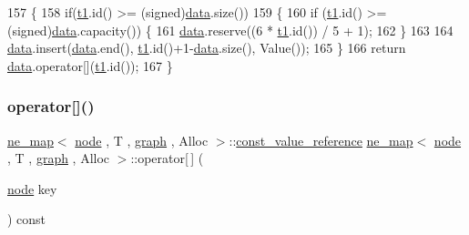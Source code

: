 \begin{DoxyCode}
157 \{
158     \textcolor{keywordflow}{if}(\mbox{\hyperlink{gml2nestedsql_8cpp_a214bd1a0500f5739ce581a8bcffb518a}{t1}}.id() >= (signed)\mbox{\hyperlink{classne__map_af73307678e05a9c24c084d98b267afa8}{data}}.size())
159     \{
160     \textcolor{keywordflow}{if} (\mbox{\hyperlink{gml2nestedsql_8cpp_a214bd1a0500f5739ce581a8bcffb518a}{t1}}.id() >= (signed)\mbox{\hyperlink{classne__map_af73307678e05a9c24c084d98b267afa8}{data}}.capacity()) \{
161         \mbox{\hyperlink{classne__map_af73307678e05a9c24c084d98b267afa8}{data}}.reserve((6 * \mbox{\hyperlink{gml2nestedsql_8cpp_a214bd1a0500f5739ce581a8bcffb518a}{t1}}.id()) / 5 + 1);
162     \}
163 
164     \mbox{\hyperlink{classne__map_af73307678e05a9c24c084d98b267afa8}{data}}.insert(\mbox{\hyperlink{classne__map_af73307678e05a9c24c084d98b267afa8}{data}}.end(), \mbox{\hyperlink{gml2nestedsql_8cpp_a214bd1a0500f5739ce581a8bcffb518a}{t1}}.id()+1-\mbox{\hyperlink{classne__map_af73307678e05a9c24c084d98b267afa8}{data}}.size(), Value());
165     \}
166     \textcolor{keywordflow}{return} \mbox{\hyperlink{classne__map_af73307678e05a9c24c084d98b267afa8}{data}}.operator[](\mbox{\hyperlink{gml2nestedsql_8cpp_a214bd1a0500f5739ce581a8bcffb518a}{t1}}.id());
167 \}
\end{DoxyCode}
\mbox{\label{classne__map_ad8d23cc924963ddff8267e625dcbffc6}} 
\subsubsection{\texorpdfstring{operator[]()}{operator[]()}\hspace{0.1cm}{\footnotesize\ttfamily [2/2]}}
{\footnotesize\ttfamily \mbox{\hyperlink{classne__map}{ne\+\_\+map}}$<$ \mbox{\hyperlink{classnode}{node}} , T , \mbox{\hyperlink{classgraph}{graph}} , Alloc $>$\+::\mbox{\hyperlink{classne__map_ad2be1a01de53940aee1282ec0e34f0f7}{const\+\_\+value\+\_\+reference}} \mbox{\hyperlink{classne__map}{ne\+\_\+map}}$<$ \mbox{\hyperlink{classnode}{node}} , T , \mbox{\hyperlink{classgraph}{graph}} , Alloc $>$\+::operator\mbox{[}$\,$\mbox{]} (\begin{DoxyParamCaption}\item[{\mbox{\hyperlink{classnode}{node}}}]{key }\end{DoxyParamCaption}) const\hspace{0.3cm}{\ttfamily [inherited]}}

